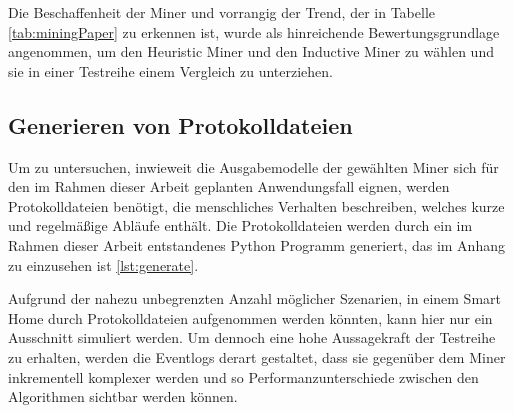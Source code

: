 \begin{table}[!h]
\centering
{}
\caption{Eigenschaften von Process Mining Verfahren zur Beurteilung ihrer Eignung für den Einsatz im Smart Home}
\label{tab:my-table}
\end{table}

Die Beschaffenheit der Miner und vorrangig der Trend, der in Tabelle \ref{tab:miningPaper} zu erkennen ist, wurde als hinreichende Bewertungsgrundlage angenommen, um den Heuristic Miner und den Inductive Miner zu wählen und sie in einer Testreihe einem Vergleich zu unterziehen. 

\subsection{Generieren von Protokolldateien}
Um zu untersuchen, inwieweit die Ausgabemodelle der gewählten Miner sich für den im Rahmen dieser Arbeit geplanten Anwendungsfall eignen, werden Protokolldateien benötigt, die menschliches Verhalten beschreiben, welches kurze und regelmäßige Abläufe enthält. Die Protokolldateien werden durch ein im Rahmen dieser Arbeit entstandenes Python Programm generiert, das im Anhang zu einzusehen ist \ref{lst:generate}.

Aufgrund der nahezu unbegrenzten Anzahl möglicher Szenarien, in einem Smart Home durch Protokolldateien aufgenommen werden könnten, kann hier nur ein Ausschnitt simuliert werden. Um dennoch eine hohe Aussagekraft der Testreihe zu erhalten, werden die Eventlogs derart gestaltet, dass sie gegenüber dem Miner inkrementell komplexer werden und so Performanzunterschiede zwischen den Algorithmen sichtbar werden können. 

